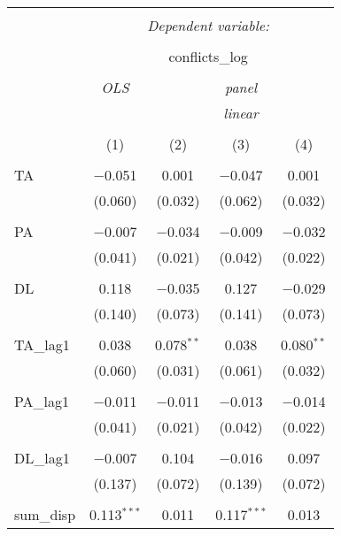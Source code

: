 
\begin{table}[!htbp] \centering 
  \caption{} 
  \label{} 
\begin{tabular}{@{\extracolsep{5pt}}lcccc} 
\\[-1.8ex]\hline 
\hline \\[-1.8ex] 
 & \multicolumn{4}{c}{\textit{Dependent variable:}} \\ 
\cline{2-5} 
\\[-1.8ex] & \multicolumn{4}{c}{conflicts\_log} \\ 
\\[-1.8ex] & \textit{OLS} & \multicolumn{3}{c}{\textit{panel}} \\ 
 & \textit{} & \multicolumn{3}{c}{\textit{linear}} \\ 
\\[-1.8ex] & (1) & (2) & (3) & (4)\\ 
\hline \\[-1.8ex] 
 TA & $-$0.051 & 0.001 & $-$0.047 & 0.001 \\ 
  & (0.060) & (0.032) & (0.062) & (0.032) \\ 
  & & & & \\ 
 PA & $-$0.007 & $-$0.034 & $-$0.009 & $-$0.032 \\ 
  & (0.041) & (0.021) & (0.042) & (0.022) \\ 
  & & & & \\ 
 DL & 0.118 & $-$0.035 & 0.127 & $-$0.029 \\ 
  & (0.140) & (0.073) & (0.141) & (0.073) \\ 
  & & & & \\ 
 TA\_lag1 & 0.038 & 0.078$^{**}$ & 0.038 & 0.080$^{**}$ \\ 
  & (0.060) & (0.031) & (0.061) & (0.032) \\ 
  & & & & \\ 
 PA\_lag1 & $-$0.011 & $-$0.011 & $-$0.013 & $-$0.014 \\ 
  & (0.041) & (0.021) & (0.042) & (0.022) \\ 
  & & & & \\ 
 DL\_lag1 & $-$0.007 & 0.104 & $-$0.016 & 0.097 \\ 
  & (0.137) & (0.072) & (0.139) & (0.072) \\ 
  & & & & \\ 
 sum\_disp & 0.113$^{***}$ & 0.011 & 0.117$^{***}$ & 0.013 \\ 

\end{tabular}
\end{table}
